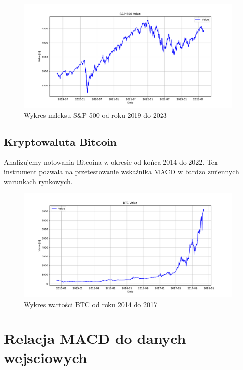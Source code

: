 \documentclass[12pt, letterpaper]{article}
\begin{document}
\vspace{-1cm}  %

\begin{figure}[h!]
    \centering
    \includegraphics[width=\linewidth]{wykres S&P 500 from 3.pdf}
    \caption{Wykres indeksu S\&P 500 od roku 2019 do 2023}
    \label{fig:sp500_2019_2023}
\end{figure}

\subsection{Kryptowaluta Bitcoin}
Analizujemy notowania Bitcoina w okresie od końca 2014 do 2022. Ten instrument pozwala na przetestowanie wskaźnika MACD w bardzo zmiennych warunkach rynkowych.

\begin{figure}[h!]
    \centering
    \includegraphics[width=\linewidth+0.4]{wykres BTC from 0.pdf}
    \caption{Wykres wartości BTC od roku 2014 do 2017}
    \label{fig:btc_2014_2017}
\end{figure}

\section{Relacja MACD do danych wejsciowych}
\end{document}
